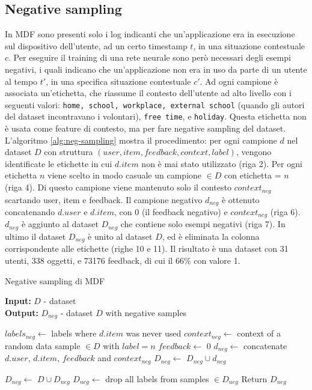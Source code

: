 \documentclass[12pt,italian]{report}
\begin{document}
\subsection{Negative sampling}
In MDF sono presenti solo i log indicanti che un'applicazione era in esecuzione sul dispositivo dell'utente, ad un certo timestamp $t$, in una situazione contestuale $c$. Per eseguire il training di una rete neurale sono però necessari degli esempi negativi, i quali indicano che un'applicazione non era in uso da parte di un utente al tempo $t'$, in una specifica situazione contestuale $c'$. Ad ogni campione è associata un'etichetta, che riassume il contesto dell'utente ad alto livello con i seguenti valori: \texttt{home, school, workplace, external school} (quando gli autori del dataset incontravano i volontari), \texttt{free time}, e \texttt{holiday}. Questa etichetta non è usata come feature di contesto, ma per fare negative sampling del dataset. 
L'algoritmo \ref{alg:neg-sampling} mostra il procedimento: per ogni campione $d$ nel dataset $D$ con struttura $(user, item, feedback, context, label)$, vengono identificate le etichette in cui $d.item$ non è mai stato utilizzato (riga 2). Per ogni etichetta $n$ viene scelto in modo casuale un campione $\in D$ con etichetta = $n$ (riga 4). Di questo campione viene mantenuto solo il contesto $context_{neg}$ scartando user, item e feedback. Il campione negativo $d_{neg}$ è ottenuto concatenando $d.user$ e $d.item$, con 0 (il feedback negativo) e $context_{neg}$ (riga 6).  $d_{neg}$ è aggiunto al dataset $D_{neg}$ che contiene solo esempi negativi (riga 7). In ultimo il dataset $D_{neg}$ è unito al dataset $D$, ed è eliminata la colonna corrispondente alle etichette (righe 10 e 11). Il risultato è una dataset con 31 utenti, 338 oggetti, e 73176 feedback, di cui il 66\% con valore 1.

\begin{algorithm}
\caption{Negative sampling di MDF}
\label{alg:neg-sampling}
 \hspace*{\algorithmicindent} \textbf{Input:} $D$ - dataset \\
 \hspace*{\algorithmicindent} \textbf{Output:} $D_{neg}$ - dataset 
$D$ with negative samples \\ 
\begin{algorithmic}[1]

	\STATE $labels_{neg} \leftarrow$ labels where $d.item$ was never used
		\STATE $context_{neg} \leftarrow$ context of a random data sample  $\in D$ with $label = n$
		\STATE $feedback \leftarrow$ 0
		\STATE $d_{neg} \leftarrow$ concatenate $d.user$, $d.item$, $feedback$ and $context_{neg}$
		\STATE $D_{neg} \leftarrow$ $D_{neg} \cup d_{neg}$ 
		
	\ENDFOR
\ENDFOR

\STATE $D_{neg} \leftarrow$ $D \cup D_{neg}$
\STATE $D_{neg} \leftarrow$ drop all labels from samples $ \in D_{neg}$
\STATE Return $D_{neg}$

\end{algorithmic}
\end{algorithm}
\end{document}

